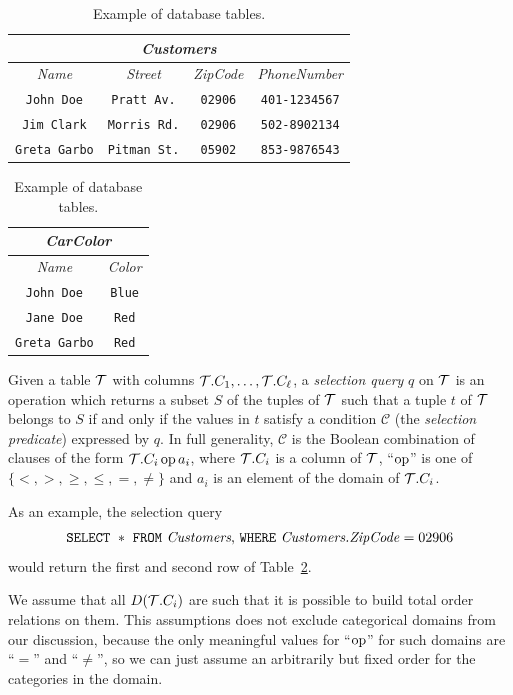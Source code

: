 \begin{table}[htb]
  \centering
  \begin{tabular}{c|c|c|c}
    \multicolumn{4}{c}{\emph{Customers}} \\
    \midrule
    \emph{Name} & \emph{Street} & \emph{ZipCode} & \emph{PhoneNumber} \\
    \midrule
    \texttt{John Doe} & \texttt{Pratt Av.} & \texttt{02906} & \texttt{401-1234567} \\
    \texttt{Jim Clark} & \texttt{Morris Rd.} & \texttt{02906} & \texttt{502-8902134} \\
    \texttt{Greta Garbo} & \texttt{Pitman St.} & \texttt{05902} & \texttt{853-9876543} \\
    \bottomrule
  \end{tabular}
  \hfill
  \begin{tabular}{c|c}
    \multicolumn{2}{c}{\emph{CarColor}} \\
    \midrule
    \emph{Name} & \emph{Color} \\
    \midrule
    \texttt{John Doe} & \texttt{Blue} \\
    \texttt{Jane Doe} & \texttt{Red} \\
    \texttt{Greta Garbo} & \texttt{Red}\\ 
    \bottomrule
  \end{tabular}
  \caption{Example of database tables.}
  \label{tab:example}
\end{table}

\begin{definition}\label{def:selectquery}
  Given a table ${\cal T}$ with columns ${\cal T}.C_1,\dotsc,{\cal T}.C_\ell$, a
  \emph{selection query} $q$ on ${\cal T}$ is an operation which returns a subset
  $S$ of the tuples of ${\cal T}$ such that a tuple $t$ of ${\cal T}$ belongs to $S$ if
  and only if the values in $t$ satisfy a condition $\mathcal{C}$
  (the \emph{selection predicate}) expressed by $q$. In full
  generality, $\mathcal{C}$ is the Boolean combination of clauses of the form
  ${\cal T}.C_i \operatorname{op} a_i$, where ${\cal T}.C_i$ is a column of ${\cal T}$, ``$\operatorname{op}$'' is one
  of $\{<,>,\ge,\le,=,\neq\}$ and $a_i$ is an element of the domain of
  ${\cal T}.C_i$.
\end{definition}

As an example, the selection query 
\[
\mbox{\texttt{SELECT} } * \mbox{ \texttt{FROM} \emph{Customers},  \texttt{WHERE}
\emph{Customers.ZipCode}} = 02906
\]
would return the first and second row of Table~\ref{tab:example}.

We assume that all $D({\cal T}.C_i)$ are such that it is possible to build total
order relations on them. This assumptions does not exclude categorical domains
from our discussion, because the only meaningful values for ``$\operatorname{op}$'' for such
domains are ``$=$'' and ``$\neq$'', so we can just assume an arbitrarily but fixed
order for the categories in the domain.

